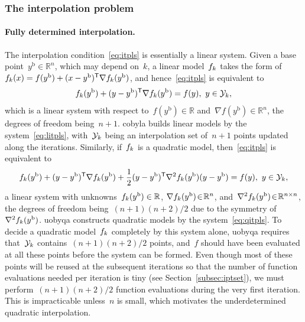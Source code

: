 \documentclass[manuscript,screen,review]{acmart}
\numberwithin{equation}{section}
\newcommand*{\R}{\mathbb{R}}
\newcommand*{\T}{\mathsf{T}}
\newcommand*{\base}{{\text{b}}}
\newcommand*{\objm}[1][k]{\obj\ifthenelse{\equal{#1}{}}{}{_{#1}}}
\newcommand*{\obj}{f}
\newcommand*{\xpt}[1][k]{\mathcal{Y}\ifthenelse{\equal{#1}{}}{}{_{#1}}}
\begin{document}
\subsubsection{The interpolation problem}
\label{subsec:iptprob}

\paragraph{\textnormal{\textbf{Fully determined interpolation.}}}

The interpolation condition~\eqref{eq:itpls} is essentially a linear system.
Given a base point~$y^{\base}\in \R^n$, which may depend on~$k$, a linear model~$\objm$ takes the form of~$\objm(x) = \obj(y^{\base}) + (x - y^{\base})^{\T} \nabla \objm(y^{\base})$, and hence~\eqref{eq:itpls} is equivalent to
\begin{equation}
    \label{eq:litpls}
    \objm(y^{\base}) + (y -y^{\base})^{\T} \nabla \objm(y^{\base})  = \obj(y),  ~ y \in \xpt,
\end{equation}
which is a linear system with respect to~$\obj(y^\base) \in \R$ and~$\nabla \obj(y^\base) \in \R^n$, the degrees of freedom being~$n+1$.
\Gls{cobyla} builds linear models by the system~\eqref{eq:litpls}, with~$\xpt$ being an interpolation set of~$n + 1$ points updated along the iterations.
Similarly, if~$\objm$ is a quadratic model, then~\eqref{eq:itpls} is equivalent to
\begin{equation}
    \label{eq:qitpls}
    \objm(y^{\base}) + (y - y^{\base})^{\T} \nabla \objm(y^{\base}) + \frac{1}{2} (y - y^{\base})^{\T}  \nabla^2 \objm(y^{\base}) (y - y^{\base}) = \obj(y),  ~ y \in \xpt,
\end{equation}
a linear system with unknowns~$\objm(y^\base) \in \R$, $\nabla \objm(y^\base) \!\in\! \R^n$, and~$\nabla^2 \objm(y^{\base})\!\in\!\R^{n \times n}$, the degrees of freedom being~$(n + 1)(n + 2) / 2$ due to the symmetry of~$\nabla^2 \objm(y^\base)$.
\Gls{uobyqa} constructs quadratic models by the system~\eqref{eq:qitpls}.
To decide a quadratic model~$\objm$ completely by this system alone, \gls{uobyqa} requires that~$\xpt$ contains~$(n + 1) (n + 2) / 2$ points, and~$\obj$ should have been evaluated at all these points before the system can be formed.
Even though most of these points will be reused at the subsequent iterations so that the number of function evaluations needed per iteration is tiny (see Section~\ref{subsec:iptset}), we must perform~$(n + 1)(n + 2) / 2$ function evaluations during the very first iteration.
This is impracticable unless~$n$ is small, which motivates the underdetermined quadratic interpolation.
\end{document}
